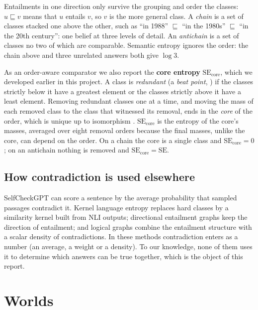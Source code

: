 \documentclass[english]{desafiokunumi}
\theoremstyle{definition}
\theoremstyle{remark}
\newcommand{\SE}{\mathrm{SE}}
\newcommand{\SEc}{\mathrm{SE}_{\mathrm{core}}}
\begin{document}
Entailments in one direction only survive the grouping and order the classes:
$u \sqsubseteq v$ means that $u$ entails $v$, so $v$ is the more general
class. A \emph{chain} is a set of classes stacked one above the other, such as
``in 1988'' $\sqsubseteq$ ``in the 1980s'' $\sqsubseteq$ ``in the 20th
century'': one belief at three levels of detail. An \emph{antichain} is a set of
classes no two of which are comparable. Semantic entropy ignores the order: the
chain above and three unrelated answers both give $\log 3$.

As an order-aware comparator we also report the \textbf{core entropy} $\SEc$,
which we developed earlier in this project. A class is \emph{redundant} (a
\emph{beat point}, \citealp{stong1966finite}) if the classes strictly below it
have a greatest element or the classes strictly above it have a least element.
Removing redundant classes one at a time, and moving the mass of each removed
class to the class that witnessed its removal, ends in the \emph{core} of the
order, which is unique up to isomorphism \citep{stong1966finite}. $\SEc$ is the
entropy of the core's masses, averaged over eight removal orders because the
final masses, unlike the core, can depend on the order. On a chain the core is
a single class and $\SEc = 0$; on an antichain nothing is removed and
$\SEc = \SE$.

\subsection{How contradiction is used elsewhere}
\label{sec:bg-related}

SelfCheckGPT \citep{manakul2023selfcheckgpt} can score a sentence by the
average probability that sampled passages contradict it. Kernel language
entropy \citep{nikitin2024kernel} replaces hard classes by a similarity kernel
built from NLI outputs; directional entailment graphs
\citep{da2024directional} keep the direction of entailment; and logical graphs
\citep{lgu2026logical} combine the entailment structure with a scalar density
of contradictions. In these methods contradiction enters as a number (an
average, a weight or a density). To our knowledge, none of them uses it to
determine which answers can be true together, which is the object of this
report.

\section{Worlds}
\label{sec:worlds}
\end{document}
